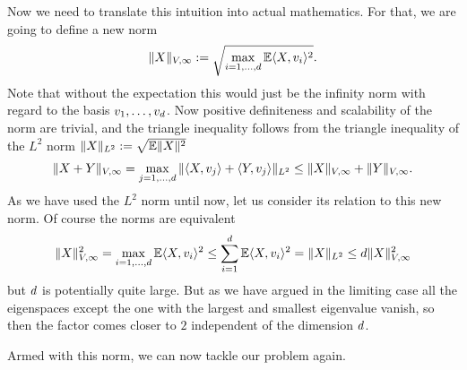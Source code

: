 Now we need to translate this intuition into actual mathematics. For that, we are
going to define a new norm
\begin{align}
	\|X\|_{V,\infty}
	:= \sqrt{\max_{i=1,\dots,d} \mathbb{E}\langle X, v_i\rangle^2}.
\end{align}
Note that without the expectation this would just be the infinity norm with regard
to the basis \(v_1,\dots,v_d\). Now positive definiteness and
scalability of the norm are trivial, and the triangle inequality follows from the
triangle inequality of the \(L^2\) norm \(\|X\|_{L^2} := \sqrt{\mathbb{E}\|X\|^2}\)
\begin{align*}
	\|X+Y\|_{V,\infty}
	= \max_{j=1,\dots,d} \|\langle X, v_j\rangle + \langle Y, v_j\rangle\|_{L^2}
	\le \|X\|_{V,\infty} + \|Y\|_{V,\infty}.
\end{align*}
As we have used the \(L^2\) norm until now, let us consider its relation
to this new norm. Of course the norms are equivalent
\begin{align*}
	\|X\|_{V,\infty}^2
	= \max_{i=1,\dots,d} \mathbb{E}\langle X, v_i\rangle^2
	\le \sum_{i=1}^d \mathbb{E}\langle X, v_i\rangle^2
	= \|X\|_{L^2}
	\le d \|X\|_{V,\infty}^2
\end{align*}
but \(d\) is potentially quite large. But as we have argued in the
limiting case all the eigenspaces except the one with the largest and smallest
eigenvalue vanish, so then the factor comes closer to \(2\) independent of the
dimension \(d\).

Armed with this norm, we can now tackle our problem again.

